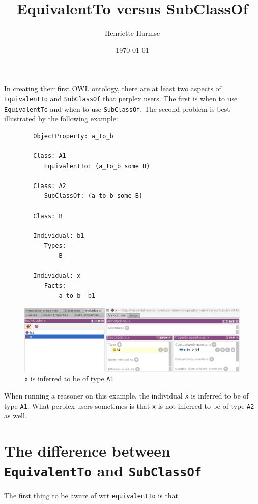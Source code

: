 \documentclass{amsart}
\title{EquivalentTo versus SubClassOf}
\author{Henriette Harmse}
\date{\today}
\begin{document}
  \maketitle
  
  In creating their first OWL ontology, there are at least two aspects of \texttt{EquivalentTo} and \texttt{SubClassOf} that perplex users. The first is when to use \texttt{EquivalentTo} and when to use \texttt{SubClassOf}. The second problem is best illustrated by the following example:
  
  
\begin{small}
	\begin{verbatim} 
		ObjectProperty: a_to_b
		
		Class: A1
		   EquivalentTo: (a_to_b some B)
		
		Class: A2
		   SubClassOf: (a_to_b some B)
		
		Class: B
		
		Individual: b1
		   Types: 
		       B
		
		Individual: x
		   Facts:  
		       a_to_b  b1
	\end{verbatim}
\end{small}  


\begin{figure}
	\centering \includegraphics[trim = 0mm 0mm 0mm 0mm, clip, scale=0.4]{./images/xTypeOfA1.png}
	\caption{\texttt{x} is inferred to be of type \texttt{A1}}
\end{figure}
  
  When running a reasoner on this example, the individual \texttt{x} is inferred to be of type \texttt{A1}. What perplex users sometimes is that \texttt{x} is not inferred to be of type \texttt{A2} as well.
  
  
  \section{The difference between \texttt{EquivalentTo} and \texttt{SubClassOf}}
  The first thing to be aware of wrt \texttt{equivalentTo} is that 
\end{document}
